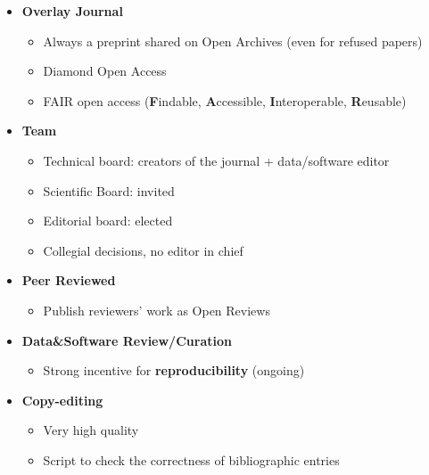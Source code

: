 \documentclass[10pt,compress,serif,aspectratio=169]{beamer}
\begin{document}
\begin{frame}[t]

  
\end{frame}
\begin{frame}[t]
  \begin{itemize}
  \pause
  \item \textbf{Overlay Journal}
   \begin{itemize}
   \item Always a preprint shared on Open Archives (even for refused papers)
   \item Diamond Open Access
   \item FAIR open access (\textbf{F}indable, \textbf{A}ccessible, \textbf{I}nteroperable, \textbf{R}eusable)
   \end{itemize}
   \pause
 \item \textbf{Team}
   \begin{itemize}
   \item Technical board: creators of the journal + data/software editor
   \item Scientific Board: invited
   \item Editorial board: elected
   \item Collegial decisions, no editor in chief
   \end{itemize}
   \pause  
 \item\textbf{Peer Reviewed}
   \begin{itemize}
   \item Publish reviewers' work as Open Reviews
   \end{itemize}
   \pause
 \item\textbf{Data\&Software Review/Curation}
   \begin{itemize}
   \item Strong incentive for \textbf{reproducibility} (ongoing)
   \end{itemize}
   \pause
 \item \textbf{Copy-editing}
   \begin{itemize}
   \item Very high quality
   \item Script to check the correctness of bibliographic entries
   \end{itemize}
 \end{itemize}
\end{frame}


\end{document}
